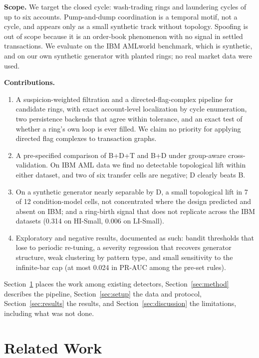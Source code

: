 \documentclass[conference]{IEEEtran}
\begin{document}
\textbf{Scope.} We target the closed cycle: wash-trading rings and laundering cycles of up to six accounts. Pump-and-dump coordination is a temporal motif, not a cycle, and appears only as a small synthetic track without topology. Spoofing is out of scope because it is an order-book phenomenon with no signal in settled transactions. We evaluate on the IBM AMLworld benchmark, which is synthetic, and on our own synthetic generator with planted rings; no real market data were used.

\textbf{Contributions.}
\begin{enumerate}
\item A suspicion-weighted filtration and a directed-flag-complex pipeline for candidate rings, with exact account-level localization by cycle enumeration, two persistence backends that agree within tolerance, and an exact test of whether a ring's own loop is ever filled. We claim no priority for applying directed flag complexes to transaction graphs.
\item A pre-specified comparison of B+D+T and B+D under group-aware cross-validation. On IBM AML data we find no detectable topological lift within either dataset, and two of six transfer cells are negative; D clearly beats B.
\item On a synthetic generator nearly separable by D, a small topological lift in 7 of 12 condition-model cells, not concentrated where the design predicted and absent on IBM; and a ring-birth signal that does not replicate across the IBM datasets (0.314 on HI-Small, 0.006 on LI-Small).
\item Exploratory and negative results, documented as such: bandit thresholds that lose to periodic re-tuning, a severity regression that recovers generator structure, weak clustering by pattern type, and small sensitivity to the infinite-bar cap (at most 0.024 in PR-AUC among the pre-set rules).
\end{enumerate}

Section~\ref{sec:related} places the work among existing detectors, Section~\ref{sec:method} describes the pipeline, Section~\ref{sec:setup} the data and protocol, Section~\ref{sec:results} the results, and Section~\ref{sec:discussion} the limitations, including what was not done.

\section{Related Work}
\label{sec:related}
\end{document}
